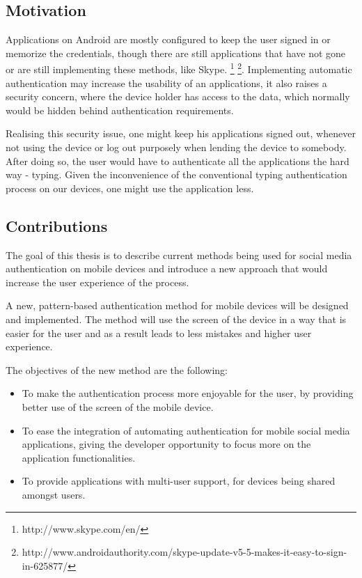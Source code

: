 \subsection{Motivation}
Applications on Android are mostly configured to keep the user signed in or memorize the credentials, though there are still applications that have not gone or are still implementing these methods, like Skype. \footnote[1]{http://www.skype.com/en/} \footnote[2]{http://www.androidauthority.com/skype-update-v5-5-makes-it-easy-to-sign-in-625877/}. Implementing automatic authentication may increase the usability of an applications, it also raises a security concern, where the device holder has access to the data, which normally would be hidden behind authentication requirements.

Realising this security issue, one might keep his applications signed out, whenever not using the device or log out purposely when lending the device to somebody. After doing so, the user would have to authenticate all the applications the hard way - typing. Given the inconvenience of the conventional typing authentication process on our devices, one might use the application less.


\subsection{Contributions}

The goal of this thesis is to describe current methods being used for social media authentication on mobile devices and introduce a new approach that would increase the user experience of the process.

A new, pattern-based authentication method for mobile devices will be designed and implemented. The method will use the screen of the device in a way that is easier for the user and as a result leads to less mistakes and higher user experience.

The objectives of the new method are the following:
\begin{itemize}
  \item To make the authentication process more enjoyable for the user, by providing better use of the screen of the mobile device.
  \item To ease the integration of automating authentication for mobile social media applications, giving the developer opportunity to focus more on the application functionalities.
  \item To provide applications with multi-user support, for devices being shared amongst users. 
\end{itemize}

